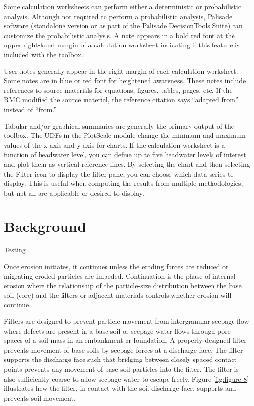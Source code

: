 \documentclass[
]{book}
\begin{document}
Some calculation worksheets can perform either a deterministic or probabilistic analysis. Although not required to perform a probabilistic analysis, Palisade \citet{RISK} software (standalone version or as part of the Palisade DecisionTools Suite) can customize the probabilistic analysis. A note appears in a bold red font at the upper right-hand margin of a calculation worksheet indicating if this feature is included with the toolbox.

User notes generally appear in the right margin of each calculation worksheet. Some notes are in blue or red font for heightened awareness. These notes include references to source materials for equations, figures, tables, pages, etc. If the RMC modified the source material, the reference citation says ``adapted from'' instead of ``from.''

Tabular and/or graphical summaries are generally the primary output of the toolbox. The UDFs in the PlotScale module change the minimum and maximum values of the x-axis and y-axis for charts. If the calculation worksheet is a function of headwater level, you can define up to five headwater levels of interest and plot them as vertical reference lines. By selecting the chart and then selecting the Filter icon to display the filter pane, you can choose which data series to display. This is useful when computing the results from multiple methodologies, but not all are applicable or desired to display.

\chapter{Background}\label{background}

Testing

Once erosion initiates, it continues unless the eroding forces are reduced or migrating eroded particles are impeded. Continuation is the phase of internal erosion where the relationship of the particle-size distribution between the base soil (core) and the filters or adjacent materials controls whether erosion will continue.

Filters are designed to prevent particle movement from intergranular seepage flow where defects are present in a base soil or seepage water flows through pore spaces of a soil mass in an embankment or foundation. A properly designed filter prevents movement of base soils by seepage forces at a discharge face. The filter supports the discharge face such that bridging between closely spaced contact points prevents any movement of base soil particles into the filter. The filter is also sufficiently coarse to allow seepage water to escape freely. Figure \ref{fig:figure-8} illustrates how the filter, in contact with the soil discharge face, supports and prevents soil movement.
\end{document}
